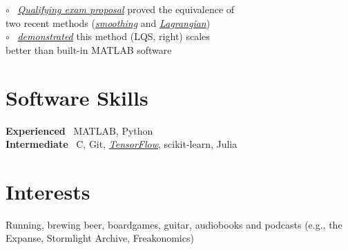 \documentclass[12pt,margintitle,line]{res}
\newcommand{\CC}{C\nolinebreak\hspace{-.05em}\raisebox{.4ex}{\scriptsize\bf +}\nolinebreak\hspace{-.10em}\raisebox{.4ex}{\scriptsize\bf +} }
\def\CC{{C\nolinebreak[4]\hspace{-.05em}\raisebox{.4ex}{\scriptsize\bf ++}}}
\begin{document}
\begin{resume}
\begin{position}
\vspace{-1.25cm}
$\circ$ \ 
\href{https://github.com/Will-Wright/lasso-quadratic-solver/blob/master/will_wright_qualifying_exam_proposal.pdf}{\textit{Qualifying exam proposal}} 
proved the equivalence of 
	\\ 	\hspace*{0.35cm} 
two recent methods 
(\href{https://link.springer.com/article/10.1007/s10589-017-9912-y}{\textit{smoothing}} 
and
\href{https://academic.oup.com/imajna/article/37/4/1635/3059683}{\textit{Lagrangian}})
	\\
$\circ$ \ \href{https://github.com/Will-Wright/lasso-quadratic-solver#demo-tutorial}{\textit{demonstrated}} 
this method (LQS, right) scales
	\\		\hspace*{0.35cm} 
better than built-in MATLAB software
\end{position}






\vspace{-0.2cm}

\section{Software Skills}

\title{}
\employer{}
\dates{}
\begin{position}

\vspace{-2.4cm}
\textbf{Experienced}  \ MATLAB, Python
	\\
\textbf{Intermediate} \ \CC, Git, \href{https://github.com/Will-Wright/MNIST-CNN}{\textsl{TensorFlow}}, scikit-learn, Julia
\end{position}


\section{Interests}

\vspace{-1.0cm}
\title{}
\employer{}
\dates{}
\begin{position}
Running, brewing beer, boardgames, guitar, audiobooks and podcasts (e.g., the Expanse, Stormlight Archive, Freakonomics)
\end{position}


\end{resume}
\end{document}
